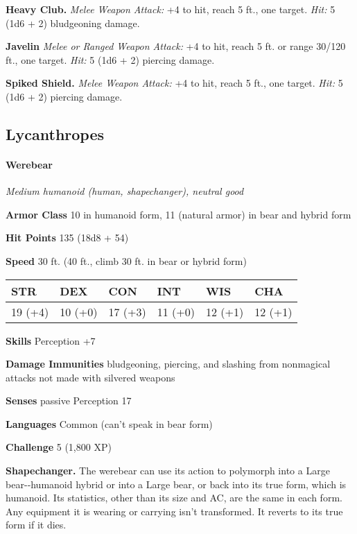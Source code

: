 \documentclass[
]{article}
\begin{document}
\textbf{Heavy Club.} \emph{Melee Weapon Attack:} +4 to hit, reach 5 ft.,
one target. \emph{Hit:} 5 (1d6 + 2) bludgeoning damage.

\textbf{Javelin} \emph{Melee or Ranged Weapon Attack:} +4 to hit, reach
5 ft. or range 30/120 ft., one target. \emph{Hit:} 5 (1d6 + 2) piercing
damage.

\textbf{Spiked Shield.} \emph{Melee Weapon Attack:} +4 to hit, reach 5
ft., one target. \emph{Hit:} 5 (1d6 + 2) piercing damage.

\hypertarget{lycanthropes}{%
\subsection{Lycanthropes}\label{lycanthropes}}

\hypertarget{werebear}{%
\paragraph{Werebear}\label{werebear}}

\emph{Medium humanoid (human, shapechanger), neutral good}

\textbf{Armor Class} 10 in humanoid form, 11 (natural armor) in bear and
hybrid form

\textbf{Hit Points} 135 (18d8 + 54)

\textbf{Speed} 30 ft. (40 ft., climb 30 ft. in bear or hybrid form)

\begin{longtable}[]{@{}llllll@{}}
\toprule
STR & DEX & CON & INT & WIS & CHA\tabularnewline
\midrule
\endhead
19 (+4) & 10 (+0) & 17 (+3) & 11 (+0) & 12 (+1) & 12 (+1)\tabularnewline
\bottomrule
\end{longtable}

\textbf{Skills} Perception +7

\textbf{Damage Immunities} bludgeoning, piercing, and slashing from
nonmagical attacks not made with silvered weapons

\textbf{Senses} passive Perception 17

\textbf{Languages} Common (can't speak in bear form)

\textbf{Challenge} 5 (1,800 XP)

\textbf{Shapechanger.} The werebear can use its action to polymorph into
a Large bear-­‐humanoid hybrid or into a Large bear, or back into its
true form, which is humanoid. Its statistics, other than its size and
AC, are the same in each form. Any equipment it is wearing or carrying
isn't transformed. It reverts to its true form if it dies.
\end{document}
